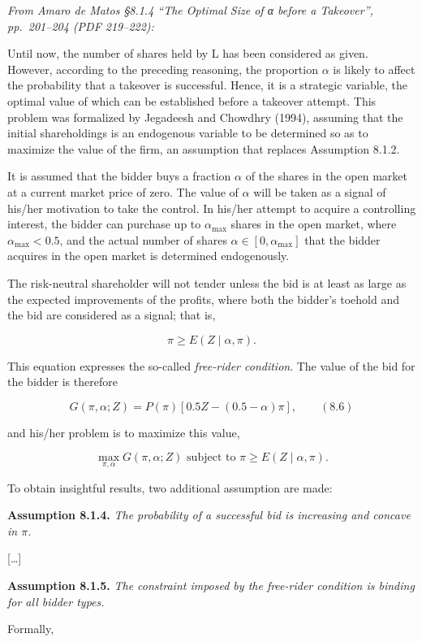 \documentclass[11pt,a4paper]{article}
\begin{document}
\emph{From Amaro de Matos §8.1.4 ``The Optimal Size of α before a Takeover'', pp.~201--204 (PDF
219--222):}

Until now, the number of shares held by L has been considered as given. However, according to the
preceding reasoning, the proportion \(\alpha\) is likely to affect the probability that a takeover
is successful. Hence, it is a strategic variable, the optimal value of which can be established
before a takeover attempt. This problem was formalized by Jegadeesh and Chowdhry (1994), assuming
that the initial shareholdings is an endogenous variable to be determined so as to maximize the
value of the firm, an assumption that replaces Assumption 8.1.2.

It is assumed that the bidder buys a fraction \(\alpha\) of the shares in the open market at a
current market price of zero. The value of \(\alpha\) will be taken as a signal of his/her
motivation to take the control. In his/her attempt to acquire a controlling interest, the bidder can
purchase up to \(\alpha_{\max}\) shares in the open market, where \(\alpha_{\max} < 0.5\), and the
actual number of shares \(\alpha \in [0, \alpha_{\max}]\) that the bidder acquires in the open
market is determined endogenously.

The risk-neutral shareholder will not tender unless the bid is at least as large as the expected
improvements of the profits, where both the bidder's toehold and the bid are considered as a signal;
that is,

\[\pi \geq E(Z \mid \alpha, \pi).\]

This equation expresses the so-called \emph{free-rider condition}. The value of the bid for the
bidder is therefore

\[G(\pi, \alpha; Z) = P(\pi)[0.5Z - (0.5 - \alpha)\pi], \qquad (8.6)\]

and his/her problem is to maximize this value,

\[\max_{\pi, \alpha} G(\pi, \alpha; Z) \text{ subject to } \pi \geq E(Z \mid \alpha, \pi).\]

To obtain insightful results, two additional assumption are made:

\textbf{Assumption 8.1.4.} \emph{The probability of a successful bid is increasing and concave in
\(\pi\).}

{[}\ldots{]}

\textbf{Assumption 8.1.5.} \emph{The constraint imposed by the free-rider condition is binding for
all bidder types.}

Formally,
\end{document}
